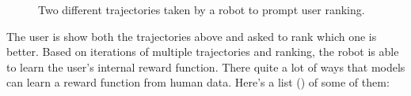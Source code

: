 \documentclass[
  letterpaper,
  numbers=noenddot,
  DIV=11,
  oneside]{scrreprt}
\theoremstyle{remark}
\begin{document}
\begin{figure}


\caption{\label{fig-reward-robot-1}Two different trajectories taken by a
robot to prompt user ranking.}

\end{figure}%

The user is show both the trajectories above and asked to rank which one
is better. Based on iterations of multiple trajectories and ranking, the
robot is able to learn the user's internal reward function. There quite
a lot of ways that models can learn a reward function from human data.
Here's a list () of
some of them:
\end{document}
